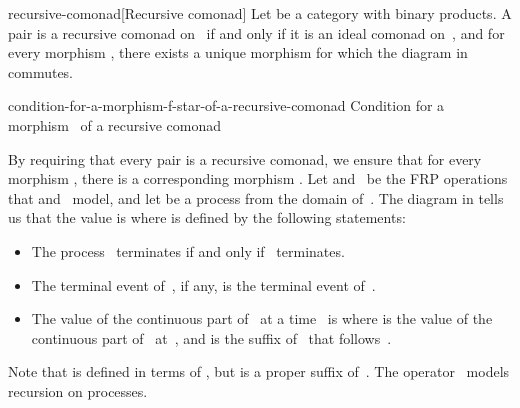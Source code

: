 \documentclass[copyright,creativecommons]{eptcs}
\newcommand{\edges}{\AtBeginMath\scriptstyle}
\begin{document}
\begin{extdefinition}{recursive-comonad}[Recursive comonad]
Let  be a category with binary products. A pair  is a recursive
comonad on~ if and only if it is an ideal comonad on~, and for every
morphism , there exists a unique morphism  for
which the diagram in
 commutes.
\end{extdefinition}
\begin{extfigure}{condition-for-a-morphism-f-star-of-a-recursive-comonad}
                 {Condition for a morphism~ of a recursive comonad}


\end{extfigure}

By requiring that every pair  is a
recursive comonad, we ensure that for every morphism ,
there is a corresponding morphism . Let  and~ be the
FRP operations that  and~ model, and let  be a process from the
domain of~. The diagram in
 tells us that
the value  is  where  is defined by the
following statements:
\begin{itemize}

\item

The process~ terminates if and only if~ terminates.

\item

The terminal event of~, if any, is the terminal event of~.

\item

The value of the continuous part of~ at a time~ is  where
 is the value of the continuous part of~ at~, and  is the suffix
of~ that follows~.

\end{itemize}
Note that  is defined in terms of , but  is a proper suffix
of~. The operator~ models recursion on processes.
\end{document}
